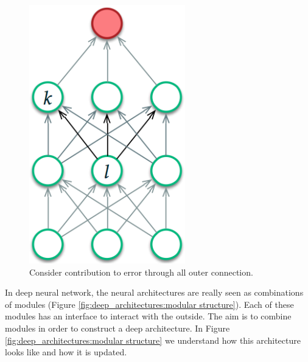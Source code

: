 \begin{figure}
    \centering
    \includegraphics[scale=0.7]{images/mlp_learning_hidden_layer.png}
    \caption{Consider contribution to error through all outer connection.}
    \label{fig.training_mld_hidden_units}
\end{figure}

In deep neural network, the neural architectures are really seen as combinations of modules (Figure \ref{fig:deep_architectures:modular structure}). Each of these modules has an interface to interact with the outside. The aim is to combine modules in order to construct a deep architecture. In Figure \ref{fig:deep_architectures:modular structure} we understand how this architecture looks like and how it is updated.

